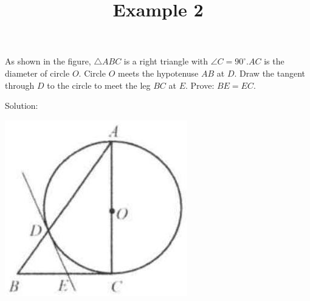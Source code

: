 \documentclass{article}
\title{Example 2}
\date{}
\begin{document}
\maketitle

As shown in the figure, \(\triangle A B C\) is a right triangle with \(\angle C=90^{\circ} . A C\) is the diameter of circle \(O\). Circle \(O\) meets the hypotenuse \(A B\) at \(D\). Draw the tangent through \(D\) to the circle to meet the leg \(B C\) at \(E\). Prove: \(B E=E C\).

Solution:
\begin{center}
\includegraphics[width=\textwidth]{images/problem_image_1.jpg}
\end{center}
\end{document}
